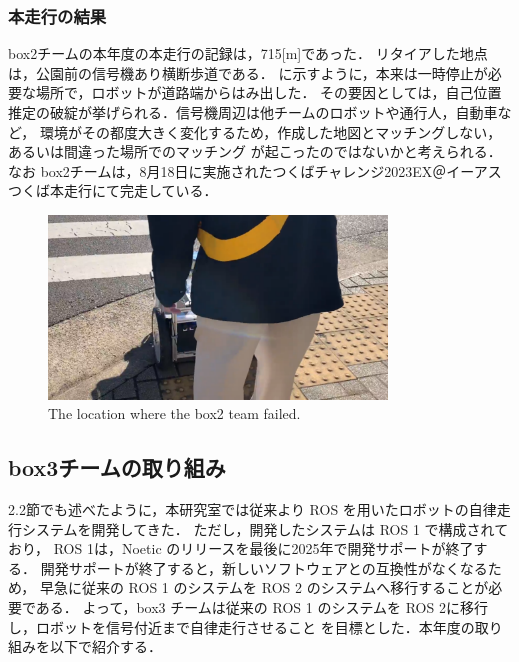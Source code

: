\documentclass[twocolumn, 9pt]{jsproceedings}
\begin{document}



\subsubsection{本走行の結果}
box2チームの本年度の本走行の記録は，715[m]であった．
リタイアした地点は，公園前の信号機あり横断歩道である．
に示すように，本来は一時停止が必要な場所で，ロボットが道路端からはみ出した．
その要因としては，自己位置推定の破綻が挙げられる．信号機周辺は他チームのロボットや通行人，自動車など，
環境がその都度大きく変化するため，作成した地図とマッチングしない，あるいは間違った場所でのマッチング
が起こったのではないかと考えられる．
なお box2チームは，8月18日に実施されたつくばチャレンジ2023EX＠イーアスつくば本走行にて完走している．

\begin{figure}[h!]
  \centering
  \includegraphics[width=90mm]{fig/result_box2_cut.pdf}
  \caption{The location where the box2 team failed.}
  \label{fig:box2-result}
\end{figure}

\subsection{box3チームの取り組み}
2.2節でも述べたように，本研究室では従来より ROS を用いたロボットの自律走行システムを開発してきた．
ただし，開発したシステムは ROS 1 で構成されており，
ROS 1は，Noetic\cite{noetic} のリリースを最後に2025年で開発サポートが終了する．
開発サポートが終了すると，新しいソフトウェアとの互換性がなくなるため，
早急に従来の ROS 1 のシステムを ROS 2 \cite{ros2}のシステムへ移行することが必要である．
よって，box3 チームは従来の ROS 1 のシステムを ROS 2に移行し，ロボットを信号付近まで自律走行させること
を目標とした．本年度の取り組みを以下で紹介する．
\end{document}
